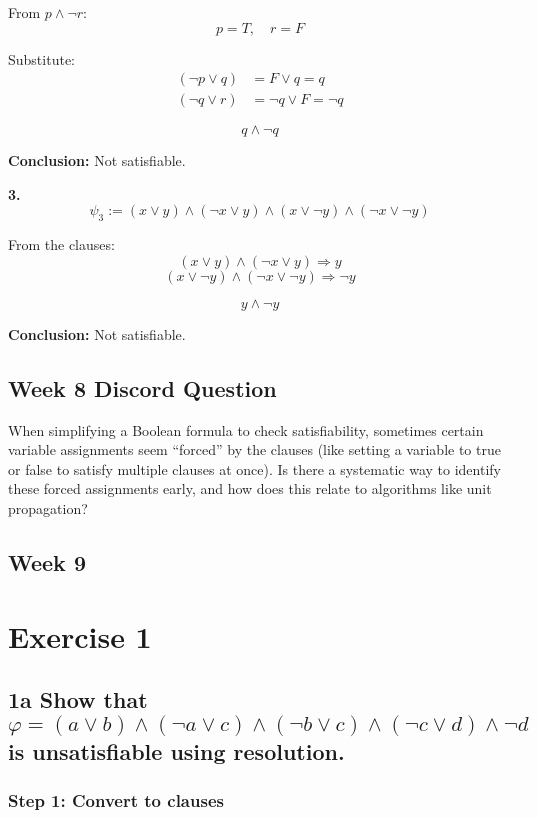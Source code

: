 \documentclass{article}
\theoremstyle{theorem}
\theoremstyle{definition}
\theoremstyle{remark}
\begin{document}
From $p \land \neg r$:
\[
p = T,\quad r = F
\]

Substitute:
\begin{align*}
(\neg p \lor q) &= F \lor q = q \\
(\neg q \lor r) &= \neg q \lor F = \neg q
\end{align*}

\[
q \land \neg q
\]

\textbf{Conclusion:} Not satisfiable.

\vspace{1em}

\textbf{3.}
\[
\psi_3 := (x \lor y) \land (\neg x \lor y) \land (x \lor \neg y) \land (\neg x \lor \neg y)
\]

From the clauses:
\[
(x \lor y) \land (\neg x \lor y) \Rightarrow y
\]
\[
(x \lor \neg y) \land (\neg x \lor \neg y) \Rightarrow \neg y
\]

\[
y \land \neg y
\]

\textbf{Conclusion:} Not satisfiable.

\subsection*{Week 8 Discord Question}
When simplifying a Boolean formula to check satisfiability, sometimes certain variable assignments seem “forced” by the clauses (like setting a variable to true or false to satisfy multiple clauses at once). Is there a systematic way to identify these forced assignments early, and how does this relate to algorithms like unit propagation?

\subsection{Week 9}

\section*{Exercise 1}

\subsection*{1a Show that 
\[
\varphi=(a\lor b)\land(\neg a\lor c)\land(\neg b\lor c)\land(\neg c\lor d)\land \neg d
\]
is unsatisfiable using resolution.}

\subsubsection*{Step 1: Convert to clauses}
\end{document}
